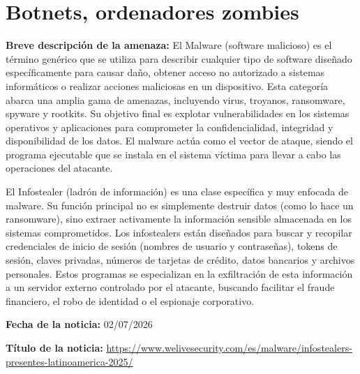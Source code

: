 \chapter{Botnets, ordenadores zombies}

\begin{tcolorbox}[
    title=Detalles de la Noticia, 
    colframe=black, %
    colback=gray!5,         %
    sharp corners,          %
    breakable              %
]

    \textbf{Breve descripción de la amenaza:}
    \vspace{0.5em}
    El Malware (software malicioso) es el término genérico que se utiliza para describir cualquier tipo de software diseñado específicamente para causar daño, obtener acceso no autorizado a sistemas informáticos o realizar acciones maliciosas en un dispositivo. Esta categoría abarca una amplia gama de amenazas, incluyendo virus, troyanos, ransomware, spyware y rootkits. Su objetivo final es explotar vulnerabilidades en los sistemas operativos y aplicaciones para comprometer la confidencialidad, integridad y disponibilidad de los datos. El malware actúa como el vector de ataque, siendo el programa ejecutable que se instala en el sistema víctima para llevar a cabo las operaciones del atacante.

    El Infostealer (ladrón de información) es una clase específica y muy enfocada de malware. Su función principal no es simplemente destruir datos (como lo hace un ransomware), sino extraer activamente la información sensible almacenada en los sistemas comprometidos. Los infostealers están diseñados para buscar y recopilar credenciales de inicio de sesión (nombres de usuario y contraseñas), tokens de sesión, claves privadas, números de tarjetas de crédito, datos bancarios y archivos personales. Estos programas se especializan en la exfiltración de esta información a un servidor externo controlado por el atacante, buscando facilitar el fraude financiero, el robo de identidad o el espionaje corporativo.
    \vspace{0.5em}

    \textbf{Fecha de la noticia:}
    \vspace{0.5em}
    02/07/2026

    \textbf{Título de la noticia:}
    \vspace{0.5em}
    \href{Los infostealers más presentes en Latinoamérica en 2025}{https://www.welivesecurity.com/es/malware/infostealers-presentes-latinoamerica-2025/}


\end{tcolorbox}

